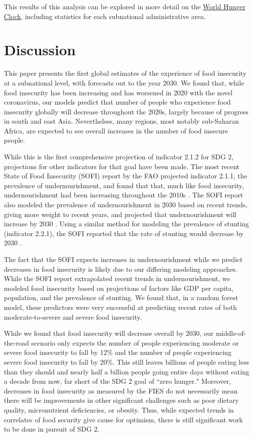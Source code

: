\documentclass{article}
\begin{document}
This results of this analysis can be explored in more detail on the \href{worldhunger.io}{World Hunger Clock}, including statistics for each subnational administrative area.


\section{Discussion}
This paper presents the first global estimates of the experience of food insecurity at a subnational level, with forecasts out to the year 2030.  We found that, while food insecurity has been increasing and has worsened in 2020 with the novel coronavirus, our models predict that number of people who experience food insecurity globally will decrease throughout the 2020s, largely because of progress in south and east Asia.  Nevertheless, many regions, most notably sub-Saharan Africa, are expected to see overall increases in the number of food insecure people.

While this is the first comprehensive projection of indicator 2.1.2 for SDG 2, projections for other indicators for that goal have been made.  The most recent State of Food Insecurity (SOFI) report by the FAO projected indicator 2.1.1, the prevalence of undernourishment, and found that that, much like food insecurity, undernourishment had been increasing throughout the 2010s \citep{sofi2020}.  The SOFI report also modeled the prevalence of undernourishment in 2030 based on recent trends, giving more weight to recent years, and projected that undernourishment will increase by 2030 \citep[Part 1, Page 11]{sofi2020}.  Using a similar method for modeling the prevalence of stunting (indicator 2.2.1), the SOFI reported that the rate of stunting would decrease by 2030 \citep[Part 1, Page 30]{sofi2020}.

The fact that the SOFI expects increases in undernourishment while we predict decreases in food insecurity is likely due to our differing modeling approaches. While the SOFI report extrapolated recent trends in undernourishment, we modeled food insecurity based on projections of factors like GDP per capita, population, and the prevalence of stunting.  We found that, in a random forest model, these predictors were very successful at predicting recent rates of both moderate-to-severe and severe food insecurity.

While we found that food insecurity will decrease overall by 2030, our middle-of-the-road scenario only expects the number of people experiencing moderate or severe food insecurity to fall by 12\% and the number of people experiencing severe food insecurity to fall by 20\%.  This still leaves billions of people eating less than they should and nearly half a billion people going entire days without eating a decade from now, far short of the SDG 2 goal of ``zero hunger."  Moreover, decreases in food insecurity as measured by the FIES do not necessarily mean there will be improvements in other significant challenges such as poor dietary quality, micronutrient deficiencies, or obesity.  Thus, while expected trends in correlates of food security give cause for optimism, there is still significant work to be done in pursuit of SDG 2.
\end{document}
